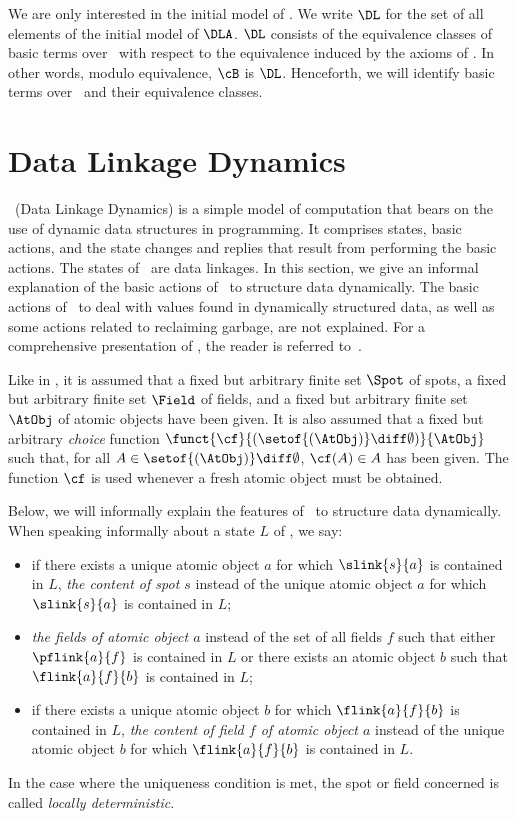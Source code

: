 \documentclass[fleqn]{llncs}
\begin{document}
We are only interested in the initial model of \DLA.
We write $\DL$ for the set of all elements of the initial model of
$\DLA$.
$\DL$ consists of the equivalence classes of basic terms over \DLA\ with
respect to the equivalence induced by the axioms of \DLA.
In other words, modulo equivalence, $\cB$ is $\DL$.
Henceforth, we will identify basic terms over \DLA\ and their
equivalence classes.

\section{Data Linkage Dynamics}
\label{sect-DLD}

\DLD\ (Data Linkage Dynamics) is a simple model of computation that
bears on the use of dynamic data structures in programming.
It comprises states, basic actions, and the state changes and
replies that result from performing the basic actions.
The states of \DLD\ are data linkages.
In this section, we give an informal explanation of the basic actions of
\DLD\ to structure data dynamically.
The basic actions of \DLD\ to deal with values found in dynamically
structured data, as well as some actions related to reclaiming garbage,
are not explained.
For a comprehensive presentation of \DLD, the reader is referred
to~\cite{BM08d}.

Like in \DLA, it is assumed that a fixed but arbitrary finite set
$\Spot$ of spots, a fixed but arbitrary finite set $\Field$ of fields,
and a fixed but arbitrary finite set $\AtObj$ of atomic objects have
been given.
It is also assumed that a fixed but arbitrary \emph{choice}
function $\funct{\cf}{(\setof{(\AtObj)} \diff \emptyset)}{\AtObj}$ such
that, for all $A \in \setof{(\AtObj)} \diff \emptyset$, $\cf(A) \in A$
has been given.
The function $\cf$ is used whenever a fresh atomic object must be
obtained.

Below, we will informally explain the features of \DLD\ to structure data
dynamically.
When speaking informally about a state $L$ of \DLD, we say:
\begin{itemize}
\item
if there exists a unique atomic object $a$ for which $\slink{s}{a}$ is
contained in $L$, \emph{the content of spot $s$} instead of the unique
atomic object $a$ for which $\slink{s}{a}$ is contained in $L$;
\item
\emph{the fields of atomic object $a$} instead of the set of all fields
$f$ such that either $\pflink{a}{f}$ is contained in $L$ or there
exists an atomic object $b$ such that $\flink{a}{f}{b}$ is contained in
$L$;
\item
if there exists a unique atomic object $b$ for which $\flink{a}{f}{b}$
is contained in $L$, \emph{the content of field $f$ of atomic object
$a$} instead of the unique atomic object $b$ for which $\flink{a}{f}{b}$
is contained in $L$.
\end{itemize}
In the case where the uniqueness condition is met, the spot or field
concerned is called \emph{locally deterministic}.
\end{document}
